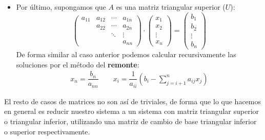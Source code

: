 \begin{ejes}
\begin{itemize}
$$\begin{pmatrix}
            \vdots\\
            b_n
            \end{pmatrix}$$
            Las soluciones de este sistema se pueden calcular de forma recursiva por el método del \textbf{descenso}:
            \begin{align}
             x_1=\dfrac{b_1}{a_{11}}\qquad x_i=
\dfrac{1}{a_{ii}}(b_i-\sum_{j=1}^{i-1}a_{ij}x_j) 
\label{met:des}
            \end{align}
\item Por último, supongamos que $A$ es una matriz triangular superior ($U$):
$$\begin{pmatrix}
             a_{11}&a_{12}&\cdots &a_{1n} \\
            &a_{22}&\cdots&a_{2n} \\
            & &\ddots& \vdots\\
            & &  &a_{nn}
            \end{pmatrix}\cdot \begin{pmatrix}
            x_1\\
            x_2\\
            \vdots\\
            x_n
            \end{pmatrix}=\begin{pmatrix}
            b_1\\
            b_2\\
            \vdots\\
            b_n
            \end{pmatrix}$$
        De forma similar al caso anterior podemos calcular recursivamente las soluciones por el método del \textbf{remonte}:
        \begin{align}
           x_n=\dfrac{b_n}{a_{nn}}  \qquad x_i=\dfrac{1}{a_{ii}}(b_i-\sum_{j=i+1}^{n}a_{ij}x_j)
           \label{met:rem}
        \end{align}
        \end{itemize}
        \end{ejes}
\begin{obs}
El resto de casos de matrices no son así de triviales, de forma que lo que hacemos en general es reducir nuestro sistema a un sistema con matriz triangular superior o triangular inferior, utilizando una matriz de cambio de base triangular inferior o superior respectivamente.
\end{obs}
